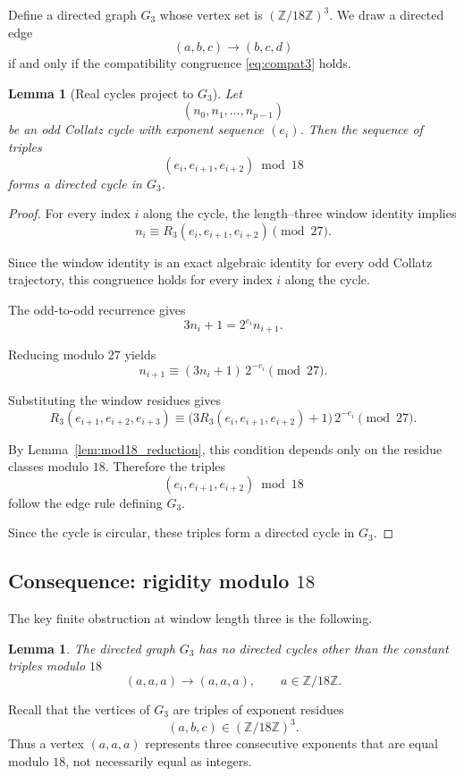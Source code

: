 \documentclass[11pt]{article}
\theoremstyle{definition}
\theoremstyle{plain}
\newtheorem{lemma}[theorem]{Lemma}
\theoremstyle{remark}
\begin{document}
Define a directed graph $G_3$ whose vertex set is $(\mathbb{Z}/18\mathbb{Z})^3$.
We draw a directed edge
\[
(a,b,c)\longrightarrow (b,c,d)
\]
if and only if the compatibility congruence \eqref{eq:compat3} holds.

\begin{lemma}[Real cycles project to $G_3$]\label{lem:projection_to_G3}
Let
\[
(n_0,n_1,\dots,n_{p-1})
\]
be an odd Collatz cycle with exponent sequence $(e_i)$.
Then the sequence of triples
\[
(e_i,e_{i+1},e_{i+2}) \bmod 18
\]
forms a directed cycle in $G_3$.
\end{lemma}

\begin{proof}
For every index $i$ along the cycle, the length--three window identity
implies
\[
n_i \equiv R_3(e_i,e_{i+1},e_{i+2}) \pmod{27}.
\]

Since the window identity is an exact algebraic identity for every odd
Collatz trajectory, this congruence holds for every index $i$ along the
cycle.

The odd-to-odd recurrence gives
\[
3n_i+1 = 2^{e_i} n_{i+1}.
\]

Reducing modulo $27$ yields
\[
n_{i+1} \equiv (3n_i+1)\,2^{-e_i}\pmod{27}.
\]

Substituting the window residues gives
\[
R_3(e_{i+1},e_{i+2},e_{i+3})
\equiv
\bigl(3R_3(e_i,e_{i+1},e_{i+2})+1\bigr)\,2^{-e_i}
\pmod{27}.
\]

By Lemma~\ref{lem:mod18_reduction}, this condition depends only on the
residue classes modulo $18$.
Therefore the triples
\[
(e_i,e_{i+1},e_{i+2}) \bmod 18
\]
follow the edge rule defining $G_3$.

Since the cycle is circular, these triples form a directed cycle in $G_3$.
\end{proof}

\subsection{Consequence: rigidity modulo $18$}

The key finite obstruction at window length three is the following.

\begin{lemma}\label{lem:G3_only_constant_cycles}
The directed graph $G_3$ has no directed cycles other than the constant
triples modulo $18$
\[
(a,a,a)\to(a,a,a),
\qquad a\in\mathbb{Z}/18\mathbb{Z}.
\]
\end{lemma}

Recall that the vertices of $G_3$ are triples of exponent residues
\[
(a,b,c)\in(\mathbb{Z}/18\mathbb{Z})^3.
\]
Thus a vertex $(a,a,a)$ represents three consecutive exponents that are
equal modulo $18$, not necessarily equal as integers.
\end{document}
